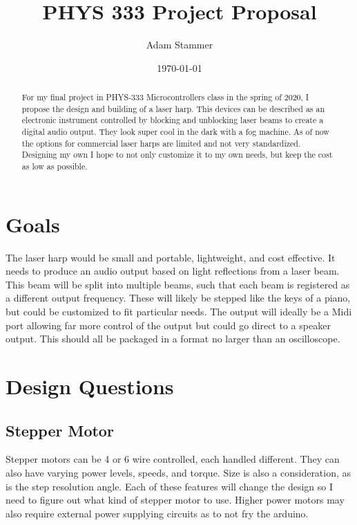 \documentclass[prb,preprint]{revtex4-1}
\begin{document}
\title{PHYS 333 Project Proposal}
\author{Adam Stammer}

\date{\today}

\begin{abstract}
For my final project in PHYS-333 Microcontrollers class in the spring of 2020, I propose the design and building of a laser harp. This devices can be described as an electronic instrument controlled by blocking and unblocking laser beams to create a digital audio output. They look super cool in the dark with a fog machine. As of now the options for commercial laser harps are limited and not very standardized. Designing my own I hope to not only customize it to my own needs, but keep the cost as low as possible.
\end{abstract}

\maketitle




\section{Goals}
The laser harp would be small and portable, lightweight, and cost effective. It needs to produce an audio output based on light reflections from a laser beam. This beam will be split into multiple beams, such that each beam is registered as a different output frequency. These will likely be stepped like the keys of a piano, but could be customized to fit particular needs. The output will ideally be a Midi port allowing far more control of the output but could go direct to a speaker output. This should all be packaged in a format no larger than an oscilloscope.

\section{Design Questions}
\subsection{Stepper Motor}
Stepper motors can be 4 or 6 wire controlled, each handled different. They can also have varying power levels, speeds, and torque. Size is also a consideration, as is the step resolution angle. Each of these features will change the design so I need to figure out what kind of stepper motor to use. Higher power motors may also require external power supplying circuits as to not fry the arduino.
\end{document}
